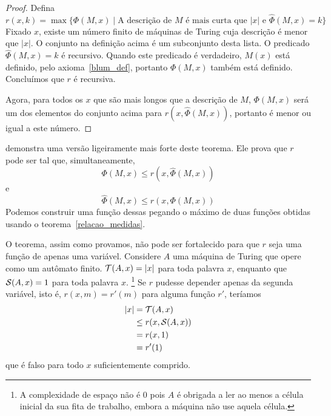 \begin{proof}
    Defina
    \begin{equation*}
        r( x, k ) = \max \{ \Phi(M, x) \mid
            \text{A descrição de $M$ é mais curta que $|x|$}
            \text{ e }
            \hat \Phi(M, x) = k
        \}
    \end{equation*}
    Fixado $x$, existe um número finito de máquinas de Turing
    cuja descrição é menor que $|x|$.
    O conjunto na definição acima é um subconjunto desta lista.
    O predicado $\hat \Phi(M, x) = k$ é recursivo.
    Quando este predicado é verdadeiro,
    $M(x)$ está definido, pelo axioma~\ref{blum_def},
    portanto $\Phi(M, x)$ também está definido.
    Concluímos que $r$ é recursiva.

    Agora, para todos os $x$ que são mais longos que a descrição de $M$,
    $\Phi(M, x)$ será um dos elementos do conjunto acima
    para $r( x, \hat \Phi(M, x))$,
    portanto é menor ou igual a este número.
\end{proof}

 demonstra uma versão ligeiramente mais forte
deste teorema.
Ele prova que $r$ pode ser tal que,
simultaneamente,
\begin{equation*}
    \Phi(M, x) \leq r( x, \hat \Phi(M, x))
\end{equation*}
e
\begin{equation*}
    \hat \Phi(M, x) \leq r( x, \Phi(M, x))
\end{equation*}
Podemos construir uma função dessas
pegando o máximo de duas funções obtidas
usando o teorema~\ref{relacao_medidas}.

O teorema,
assim como provamos,
não pode ser fortalecido
para que $r$ seja uma função de apenas uma variável.
Considere $A$ uma máquina de Turing
que opere como um autômato finito.
${\mathcal{T}}(A, x) = |x|$ para toda palavra $x$,
enquanto que ${\mathcal{S}}(A, x) = 1$ para toda palavra $x$.
\footnote{
    A complexidade de espaço não é $0$
    pois $A$ é obrigada a ler
    ao menos a célula inicial da sua fita de trabalho,
    embora a máquina não use aquela célula.
}
Se $r$ pudesse depender apenas da segunda variável,
isto é, $r(x, m) = r'(m)$ para alguma função $r'$,
teríamos
\begin{align*}
    |x| &= {\mathcal{T}}(A, x) \\
        &\leq r(x, {\mathcal{S}}(A, x)) \\
        &= r(x, 1) \\
        &= r'(1)
\end{align*}
que é falso para todo $x$ suficientemente comprido.


